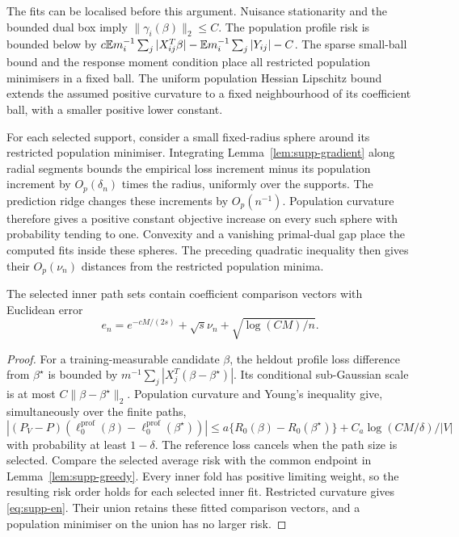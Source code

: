 The fits can be localised before this argument. Nuisance stationarity
and the bounded dual box imply $\|\gamma_i(\beta)\|_2\leq C$.
The population profile risk is bounded below by
$c\mathbb{E} m_i^{-1}\sum_j|X_{ij}^T\beta|
-\mathbb{E} m_i^{-1}\sum_j|Y_{ij}|-C$. The sparse small-ball bound and
the response moment condition place all restricted population
minimisers in a fixed ball. The uniform population Hessian Lipschitz
bound extends the assumed positive curvature to a fixed neighbourhood
of its coefficient ball, with a smaller positive lower constant.

For each selected support, consider a small fixed-radius sphere around
its restricted population minimiser. Integrating
Lemma~\ref{lem:supp-gradient} along radial segments bounds the
empirical loss increment minus its population increment by
$O_p(\delta_n)$ times the radius, uniformly over the supports.
The prediction ridge changes these increments by $O_p(n^{-1})$.
Population curvature therefore gives a positive constant objective
increase on every such sphere with probability tending to one.
Convexity and a vanishing primal-dual gap place the computed fits
inside these spheres. The preceding quadratic inequality then gives
their $O_p(\nu_n)$ distances from the restricted population minima.

\begin{lemma}\label{lem:supp-outcome-cv}
The selected inner path sets contain coefficient comparison vectors
with Euclidean error
\begin{equation}\label{eq:supp-en}
 e_n=e^{-cM/(2s)}+\sqrt{s}\nu_n+\sqrt{\log(CM)/n}.
\end{equation}
\end{lemma}

\begin{proof}
For a training-measurable candidate $\beta$, the heldout profile
loss difference from $\beta^\star$ is bounded by
$m^{-1}\sum_j|X_j^T(\beta-\beta^\star)|$. Its conditional
sub-Gaussian scale is at most $C\|\beta-\beta^\star\|_2$.
Population curvature and Young's inequality give, simultaneously
over the finite paths,
\[
 |(P_V-P)(\ell_0^{\mathrm{prof}}(\beta)
                  -\ell_0^{\mathrm{prof}}(\beta^\star))|
 \leq a\{R_0(\beta)-R_0(\beta^\star)\}
                       +C_a\log(CM/\delta)/|V|
\]
with probability at least $1-\delta$. The reference loss cancels
when the path size is selected. Compare the selected average risk
with the common endpoint in Lemma~\ref{lem:supp-greedy}. Every inner
fold has positive limiting weight, so the resulting risk order holds
for each selected inner fit. Restricted curvature gives
\eqref{eq:supp-en}. Their union retains these fitted comparison
vectors, and a population minimiser on the union has no larger risk.
\end{proof}

